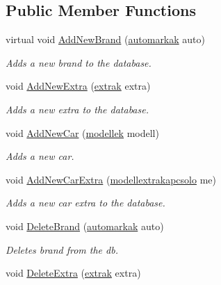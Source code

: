 \subsection*{Public Member Functions}
\begin{DoxyCompactItemize}
\item 
virtual void \mbox{\hyperlink{class_car_shop_1_1_data_1_1_data_base_handler_ab75102127241cfcc67aecbbc21f6ad59}{Add\+New\+Brand}} (\mbox{\hyperlink{class_car_shop_1_1_data_1_1automarkak}{automarkak}} auto)
\begin{DoxyCompactList}\small\item\em Adds a new brand to the database. \end{DoxyCompactList}\item 
void \mbox{\hyperlink{class_car_shop_1_1_data_1_1_data_base_handler_a5f0973e7680a685c73f1ccec00b75701}{Add\+New\+Extra}} (\mbox{\hyperlink{class_car_shop_1_1_data_1_1extrak}{extrak}} extra)
\begin{DoxyCompactList}\small\item\em Adds a new extra to the database. \end{DoxyCompactList}\item 
void \mbox{\hyperlink{class_car_shop_1_1_data_1_1_data_base_handler_aab105b74a843101ccc77a235e177badc}{Add\+New\+Car}} (\mbox{\hyperlink{class_car_shop_1_1_data_1_1modellek}{modellek}} modell)
\begin{DoxyCompactList}\small\item\em Adds a new car. \end{DoxyCompactList}\item 
void \mbox{\hyperlink{class_car_shop_1_1_data_1_1_data_base_handler_a20d8fe16deb78c4e3cd284e03db8a667}{Add\+New\+Car\+Extra}} (\mbox{\hyperlink{class_car_shop_1_1_data_1_1modellextrakapcsolo}{modellextrakapcsolo}} me)
\begin{DoxyCompactList}\small\item\em Adds a new car extra to the database. \end{DoxyCompactList}\item 
void \mbox{\hyperlink{class_car_shop_1_1_data_1_1_data_base_handler_adc585650f1061f34034769e941dd05ec}{Delete\+Brand}} (\mbox{\hyperlink{class_car_shop_1_1_data_1_1automarkak}{automarkak}} auto)
\begin{DoxyCompactList}\small\item\em Deletes brand from the db. \end{DoxyCompactList}\item 
void \mbox{\hyperlink{class_car_shop_1_1_data_1_1_data_base_handler_afcd19abfce52c381a2020e404d4350d4}{Delete\+Extra}} (\mbox{\hyperlink{class_car_shop_1_1_data_1_1extrak}{extrak}} extra)

\end{DoxyCompactItemize}
